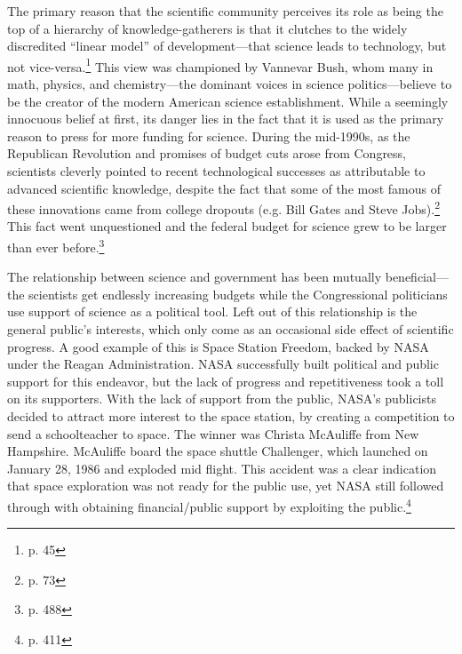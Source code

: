 \documentclass{article}[12pt]
\begin{document}
The primary reason that the scientific community perceives its role as being
the top of a hierarchy of knowledge-gatherers is that it clutches to the widely
discredited ``linear model'' of development---that science leads to technology,
but not vice-versa.\footnote{p. 45} This view was championed by Vannevar Bush,
whom many in math, physics, and chemistry---the dominant voices in science
politics---believe to be the creator of the modern American science
establishment. While a seemingly innocuous belief at first, its danger lies in
the fact that it is used as the primary reason to press for more funding for
science. During the mid-1990s, as the Republican Revolution and promises of
budget cuts arose from Congress, scientists cleverly pointed to recent
technological successes as attributable to advanced scientific knowledge,
despite the fact that some of the most famous of these innovations came from
college dropouts (e.g. Bill Gates and Steve Jobs).\footnote{p. 73} This fact went
unquestioned and the federal budget for science grew to be larger than ever
before.\footnote{p. 488}

The relationship between science and government has been mutually
beneficial---the scientists get endlessly increasing budgets while the
Congressional politicians use support of science as a political tool. Left out
of this relationship is the general public's interests, which only come as an
occasional side effect of scientific progress. A good example of this is
Space Station Freedom, backed by NASA under the Reagan Administration.  NASA
successfully built political and public support for this endeavor, but the
lack of progress and repetitiveness took a toll on its supporters.  With the
lack of support from the public, NASA's publicists decided to attract more
interest to the space station, by creating a competition to send a
schoolteacher to space.  The winner was Christa McAuliffe from New Hampshire.
McAuliffe board the space shuttle Challenger, which launched on January 28,
1986 and exploded mid flight.  This accident was a clear indication that space
exploration was not ready for the public use, yet NASA still followed through
with obtaining financial/public support by exploiting the
public.\footnote{p. 411}
\end{document}
